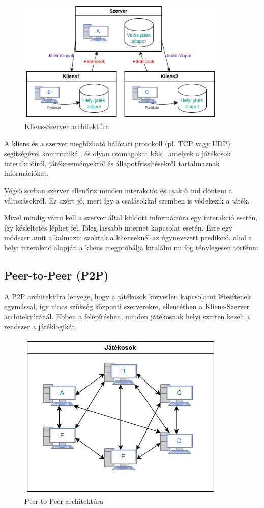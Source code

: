 \documentclass[]{thesis-ekf}
\theoremstyle{definition}
\theoremstyle{remark}
\begin{document}
\begin{figure}[ht!]
	\centering
	\includegraphics[width=10cm]{ClientServer}
	\caption{Kliens-Szerver architektúra}
	\label{fig-clientserver}
\end{figure}

A kliens és a szerver megbízható hálózati protokoll (pl. TCP vagy UDP) segítségével kommunikál, és olyan csomagokat küld, amelyek a játékosok interakcióiról, játékeseményekről és állapotfrissítésekről tartalmaznak információkat. 
 
Végső sorban szerver ellenőriz minden interakciót és csak ő tud dönteni a változásokról. Ez azért jó, mert így a csalásokkal szemben is védekezik a játék. 

Mivel mindig várni kell a szerver által küldött információra egy interakció esetén, így késleltetés léphet fel, főleg lassabb internet kapcsolat esetén. Erre egy módszer amit alkalmazni szoktak a klienseknél az úgynevezett predikció, ahol a helyi interakció alapján a kliens megpróbálja kitalálni mi fog ténylegesen történni. \cite{MediumClientServer}

\subsection{Peer-to-Peer (P2P)}

A P2P architektúra lényege, hogy a játékosok közvetlen kapcsolatot létesítenek egymással, így nincs szükség központi szerverekre, ellentétben a Kliens-Szerver architektúránál. Ebben a felépítésben, minden játékosnak helyi szinten kezeli a rendszer a játéklogikát.

\begin{figure}[ht!]
	\centering
	\includegraphics[width=10cm]{P2P}
	\caption{Peer-to-Peer architektúra}
	\label{fig-p2p}
\end{figure}
\end{document}

